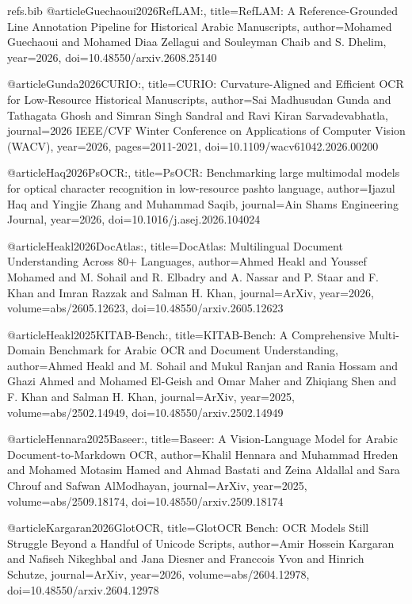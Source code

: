 \begin{filecontents}{refs.bib}
    @article{Guechaoui2026RefLAM:,
    title={RefLAM: A Reference-Grounded Line Annotation Pipeline for Historical Arabic Manuscripts},
    author={Mohamed Guechaoui and Mohamed Diaa Zellagui and Souleyman Chaib and S. Dhelim},
    year={2026},
    doi={10.48550/arxiv.2608.25140}
    }
    
    @article{Gunda2026CURIO:,
    title={CURIO: Curvature-Aligned and Efficient OCR for Low-Resource Historical Manuscripts},
    author={Sai Madhusudan Gunda and Tathagata Ghosh and Simran Singh Sandral and Ravi Kiran Sarvadevabhatla},
    journal={2026 IEEE/CVF Winter Conference on Applications of Computer Vision (WACV)},
    year={2026},
    pages={2011-2021},
    doi={10.1109/wacv61042.2026.00200}
    }
    
    @article{Haq2026PsOCR:,
    title={PsOCR: Benchmarking large multimodal models for optical character recognition in low-resource pashto language},
    author={Ijazul Haq and Yingjie Zhang and Muhammad Saqib},
    journal={Ain Shams Engineering Journal},
    year={2026},
    doi={10.1016/j.asej.2026.104024}
    }
    
    @article{Heakl2026DocAtlas:,
    title={DocAtlas: Multilingual Document Understanding Across 80+ Languages},
    author={Ahmed Heakl and Youssef Mohamed and M. Sohail and R. Elbadry and A. Nassar and P. Staar and F. Khan and Imran Razzak and Salman H. Khan},
    journal={ArXiv},
    year={2026},
    volume={abs/2605.12623},
    doi={10.48550/arxiv.2605.12623}
    }
    
    @article{Heakl2025KITAB-Bench:,
    title={KITAB-Bench: A Comprehensive Multi-Domain Benchmark for Arabic OCR and Document Understanding},
    author={Ahmed Heakl and M. Sohail and Mukul Ranjan and Rania Hossam and Ghazi Ahmed and Mohamed El-Geish and Omar Maher and Zhiqiang Shen and F. Khan and Salman H. Khan},
    journal={ArXiv},
    year={2025},
    volume={abs/2502.14949},
    doi={10.48550/arxiv.2502.14949}
    }
    
    @article{Hennara2025Baseer:,
    title={Baseer: A Vision-Language Model for Arabic Document-to-Markdown OCR},
    author={Khalil Hennara and Muhammad Hreden and Mohamed Motasim Hamed and Ahmad Bastati and Zeina Aldallal and Sara Chrouf and Safwan AlModhayan},
    journal={ArXiv},
    year={2025},
    volume={abs/2509.18174},
    doi={10.48550/arxiv.2509.18174}
    }
    
    @article{Kargaran2026GlotOCR,
    title={GlotOCR Bench: OCR Models Still Struggle Beyond a Handful of Unicode Scripts},
    author={Amir Hossein Kargaran and Nafiseh Nikeghbal and Jana Diesner and Franccois Yvon and Hinrich Schutze},
    journal={ArXiv},
    year={2026},
    volume={abs/2604.12978},
    doi={10.48550/arxiv.2604.12978}
    }
    

\end{filecontents}
